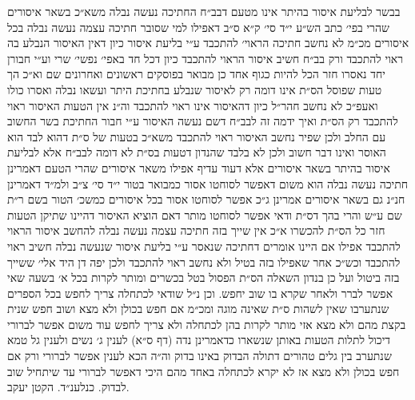 \documentclass[12pt, openany]{book}
\begin{document}
\begin{multicols}{2}
בבשר לבליעת איסור בהיתר אינו מטעם דבב״ח החתיכה נעשה נבלה משא״כ בשאר איסורים שהרי בפי׳ כתב הש״ע י״ד סי׳ ק״א ס״ב דאפילו למי שסובר חתיכה עצמה נעשה נבלה בכל איסורים מכ״מ לא נחשב חתיכה הראוי׳ להתכבד ע״י בליעת איסור כיון דאין האיסור הנבלע בה ראוי להתכבד ורק בב״ח חשיב איסור הראוי להתכבד כיון דכל חד באפי׳ נפשי׳ שרי וע״י חבורן יחד נאסרו חזר הכל להיות כגוף אחד כן מבואר בפוסקים ראשונים ואחרונים שם וא״כ הך טעות שפוסל הס״ת אינו דומה רק לאיסור שנבלע בחתיכת היתר ועשאו נבלה ואסרו כולו ואעפ״כ לא נחשב חהר״ל כיון דהאיסור אינו ראוי להתכבד וה״נ אין הטעות האיסור ראוי להתכבד רק הס״ת ואיך ידמה זה לבב״ח דשם נעשה האיסור ע״י חבור החתיכת בשר החשוב עם החלב ולכן שפיר נחשב האיסור ראוי להתכבד משא״כ בטעות של ס״ת דהוא לבד הוא האוסר ואינו דבר חשוב ולכן לא בלבד שהנדון דטעות בס״ת לא דומה לבב״ח אלא לבליעת איסור בהיתר בשאר איסורים אלא דעוד עדיף אפילו משאר איסורים שהרי הטעם דאמרינן חתיכה נעשה נבלה הוא משום דאפשר לסוחטו אסור כמבואר בטור י״ד סי׳ צ״ב ולמ״ד דאמרינן חנ״נ גם בשאר איסורים אמרינן ג״כ אפשר לסוחטו אסור בכל איסורים כמשכ׳ הטור בשם ר״ת שם ע״ש והרי בהך דס״ת ודאי אפשר לסוחטו מותר דאם הוציא האיסור דהיינו שתיקן הטעות חזר כל הס״ת להכשרו א״כ אין שייך בזה חתיכה עצמה נעשה נבלה להחשב איסור הראוי להתכבד אפילו אם היינו אומרים דחתיכה שנאסר ע״י בליעת איסור שנעשה נבלה חשיב ראוי להתכבד וכש״כ אחר שאפילו בזה בטיל ולא נחשב ראוי להתכבד ולכן יפה דן היד אלי׳ ששייך בזה ביטול ועל כן בנדון השאלה הס״ת הפסול בטל בכשרים ומותר לקרות בכל א׳ בשעה שאי אפשר לברר ולאחר שקרא בו שוב יחפש. וכן נ״ל שודאי לכתחלה צריך לחפש בכל הספרים שנתערבו שאין לשהות ס״ת שאינה מוגה ומכ״מ אם חפש בכולן ולא מצא ושוב חפש שנית בקצת מהם ולא מצא אזי מותר לקרות בהן לכתחלה ולא צריך לחפש עוד משום אפשר לברורי דיכול לתלות הטעות באותן שנשארו כדאמרינן נדה (דף ס״א) לענין ג׳ נשים ולענין גל טמא שנתערב בין גלים טהורים דתולה הבדוק באינו בדוק וה״ה הכא לענין אפשר לברורי ורק אם חפש בכולן ולא מצא אז לא יקרא לכתחלה באחד מהם היכי דאפשר לברורי עד שיתחיל שוב לבדוק. כנלענ״ד. הקטן יעקב.\\\vspace{0pt}

\end{multicols}\newpage
\end{document}
